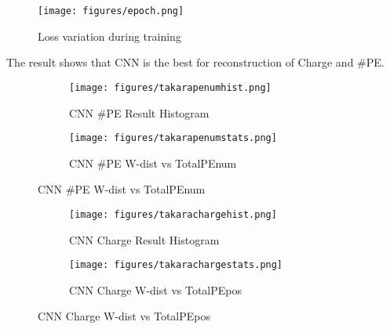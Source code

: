 \begin{figure}[H]
    \centering
    \caption{Loss variation during training}
    \texttt{[image: figures/epoch.png]}
    \label{fig:loss}
\end{figure}

The result shows that CNN is the best for reconstruction of Charge and \#PE. 

\begin{figure}[H]
\begin{minipage}{.5\textwidth}
\begin{figure}[H]
    \centering
        \texttt{[image: figures/takarapenumhist.png]}
    \caption{CNN \#PE Result Histogram}
\end{figure}
\end{minipage}
\begin{minipage}{.5\textwidth}
\begin{figure}[H]
    \centering
        \texttt{[image: figures/takarapenumstats.png]}
    \caption{CNN \#PE W-dist vs TotalPEnum}
\end{figure}
\end{minipage}
\end{figure}
\begin{figure}[H]
\begin{minipage}{.5\textwidth}
\begin{figure}[H]
    \centering
        \texttt{[image: figures/takarachargehist.png]}
    \caption{CNN Charge Result Histogram}
\end{figure}
\end{minipage}
\begin{minipage}{.5\textwidth}
\begin{figure}[H]
    \centering
        \texttt{[image: figures/takarachargestats.png]}
    \caption{CNN Charge W-dist vs TotalPEpos}
\end{figure}
\end{minipage}
\end{figure}

